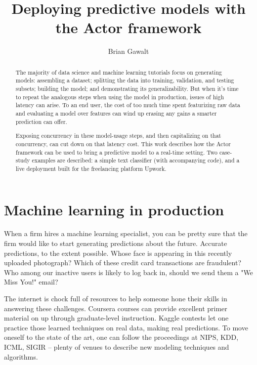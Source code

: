 \documentclass{article}
\begin{document}
\title{Deploying predictive models with the Actor framework}
\author{Brian Gawalt}

\maketitle


\begin{abstract}
The majority of data science and machine learning tutorials focus on generating models: assembling a dataset; splitting the data into training, validation, and testing subsets; building the model; and demonstrating its generalizability. But when it's time to repeat the analogous steps when using the model in production, issues of high latency can arise. To an end user, the cost of too much time spent featurizing raw data and evaluating a model over features can wind up erasing any gains a smarter prediction can offer. 

Exposing concurrency in these model-usage steps, and then capitalizing on that concurrency, can cut down on that latency cost. This work describes how the Actor framework can be used to bring a predictive model to a real-time setting. Two case-study examples are described: a simple text classifier (with accompanying code), and a live deployment built for the freelancing platform Upwork.
\end{abstract}

\section{Machine learning in production}
When a firm hires a machine learning specialist, you can be pretty sure that the firm would like to start generating predictions about the future. Accurate predictions, to the extent possible. Whose face is appearing in this recently uploaded photograph? Which of these credit card transactions are fraudulent? Who among our inactive users is likely to log back in, should we send them a "We Miss You!" email?

The internet is chock full of resources to help someone hone their skills in answering these challenges. Coursera courses can provide excellent primer material on up through graduate-level instruction.  Kaggle contests let one practice those learned techniques on real data, making real predictions. To move oneself to the state of the art, one can follow the proceedings at NIPS, KDD, ICML, SIGIR -- plenty of venues to describe new modeling techniques and algorithms.
\end{document}
